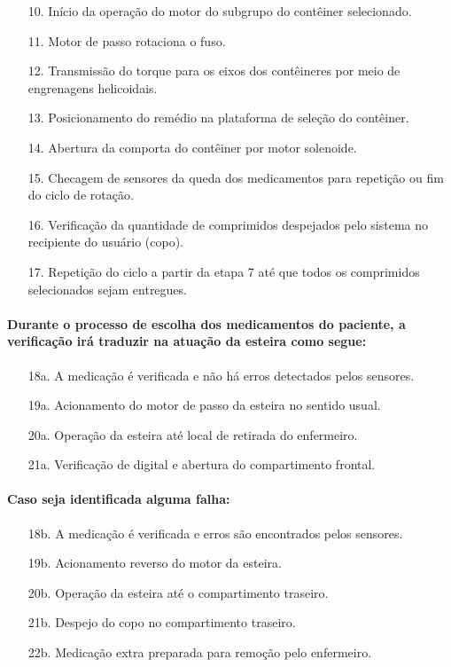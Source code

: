 \begin{enumerate}
    \item[10.] Início da operação do motor do subgrupo do contêiner selecionado.
    \item[11.] Motor de passo rotaciona o fuso.
    \item[12.] Transmissão do torque para os eixos dos contêineres por meio de engrenagens helicoidais.
    \item[13.] Posicionamento do remédio na plataforma de seleção do contêiner.
    \item[14.] Abertura da comporta do contêiner por motor solenoide.
    \item[15.] Checagem de sensores da queda dos medicamentos para repetição ou fim do ciclo de rotação.
    \item[16.] Verificação da quantidade de comprimidos despejados pelo sistema no recipiente do usuário (copo).
    \item[17.] Repetição do ciclo a partir da etapa 7 até que todos os comprimidos selecionados sejam entregues.
\end{enumerate}


\paragraph*{Durante o processo de escolha dos medicamentos do paciente, a verificação irá traduzir na atuação da esteira como segue:}

\begin{enumerate}
    \item[18a.] A medicação é verificada e não há erros detectados pelos sensores.
    \item[19a.] Acionamento do motor de passo da esteira no sentido usual.
    \item[20a.] Operação da esteira até local de retirada do enfermeiro. 
    \item[21a.] Verificação de digital e abertura do compartimento frontal.
\end{enumerate}
   
\paragraph*{Caso seja identificada alguma falha:}

\begin{enumerate}
    \item[18b.] A medicação é verificada e erros são encontrados pelos sensores.
    \item[19b.] Acionamento reverso do motor da esteira.
    \item[20b.] Operação da esteira até o compartimento traseiro.
    \item[21b.] Despejo do copo no compartimento traseiro.
    \item[22b.] Medicação extra preparada para remoção pelo enfermeiro.
\end{enumerate}

